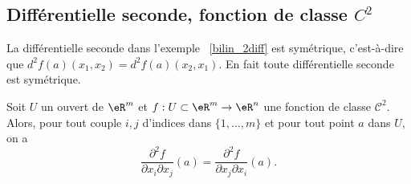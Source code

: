 \subsection{Différentielle seconde, fonction de classe \texorpdfstring{\(  C^2\)}{C2}}

La différentielle seconde dans l'exemple ~\ref{bilin_2diff} est symétrique, c'est-à-dire que \( d^2f(a)(x_1,x_2)=d^2f(a)(x_2,x_1)\). En fait toute différentielle seconde est symétrique.

\begin{theorem}[Schwarz]\label{Schwarz}
	Soit \( U\) un ouvert de \( \eR^m\) et  \( f:U\subset\eR^m\to \eR^n\) une fonction de classe \( \mathcal{C}^2\). Alors, pour tout couple \( i,j\) d'indices dans \( \{1,\ldots, m\}\) et pour tout point \( a\) dans \( U\), on a
	\[
		\frac{\partial^2 f}{\partial  x_i\partial x_j}(a)=\frac{\partial^2 f}{\partial  x_j\partial x_i}(a).
	\]
\end{theorem}
